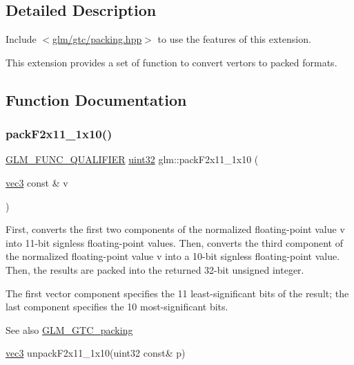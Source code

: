 \subsection{Detailed Description}
Include $<$\hyperlink{gtc_2packing_8hpp}{glm/gtc/packing.\+hpp}$>$ to use the features of this extension.

This extension provides a set of function to convert vertors to packed formats. 

\subsection{Function Documentation}
\mbox{\label{group__gtc__packing_ga8c2a0eeee677ca4dafd9e093d9e81062}} 
\subsubsection{\texorpdfstring{pack\+F2x11\+\_\+1x10()}{packF2x11\_1x10()}}
{\footnotesize\ttfamily \hyperlink{setup_8hpp_a33fdea6f91c5f834105f7415e2a64407}{G\+L\+M\+\_\+\+F\+U\+N\+C\+\_\+\+Q\+U\+A\+L\+I\+F\+I\+ER} \hyperlink{group__gtc__type__precision_ga202b6a53c105fcb7e531f9b443518451}{uint32} glm\+::pack\+F2x11\+\_\+1x10 (\begin{DoxyParamCaption}\item[{\hyperlink{group__core__types_ga1c47e8b3386109bc992b6c48e91b0be7}{vec3} const \&}]{v }\end{DoxyParamCaption})}

First, converts the first two components of the normalized floating-\/point value v into 11-\/bit signless floating-\/point values. Then, converts the third component of the normalized floating-\/point value v into a 10-\/bit signless floating-\/point value. Then, the results are packed into the returned 32-\/bit unsigned integer.

The first vector component specifies the 11 least-\/significant bits of the result; the last component specifies the 10 most-\/significant bits.

\begin{DoxySeeAlso}{See also}
\hyperlink{group__gtc__packing}{G\+L\+M\+\_\+\+G\+T\+C\+\_\+packing} 

\hyperlink{group__core__types_ga1c47e8b3386109bc992b6c48e91b0be7}{vec3} unpack\+F2x11\+\_\+1x10(uint32 const\& p) 
\end{DoxySeeAlso}
\mbox{\label{group__gtc__packing_ga0984f9598edc648d59a9643d9a61b121}} 
